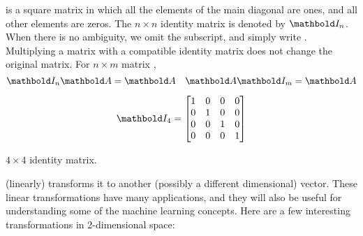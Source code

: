 
 is a square matrix
in which all the elements of the main diagonal are ones,
and all other elements are zeros.
The $n\times{}n$ identity matrix is denoted by $\vect{I}_{n}$.
When there is no ambiguity, we omit the subscript, and simply write .
Multiplying a matrix with a compatible identity matrix does not change the original matrix.
For $n \times m$ matrix ,
\[
  \vect{I}_{n} \vect{A} = \vect{A} \quad \vect{A} \vect{I}_{m} = \vect{A}
\]

\begin{marginfigure}
  \[
    \vect{I}_{4} =
    \begin{bmatrix}
      1 & 0 & 0 & 0\\
      0 & 1 & 0 & 0\\
      0 & 0 & 1 & 0 \\
      0 & 0 & 0 & 1 \\
    \end{bmatrix}
  \]
  \caption{\label{fig:identity-matrix}$4\times{}4$ identity matrix.}
\end{marginfigure}

 (linearly) transforms it to another
(possibly a different dimensional) vector.
These linear transformations have many applications,
and they will also be useful for understanding some of the machine learning concepts.
Here are a few interesting transformations in 2-dimensional space:

